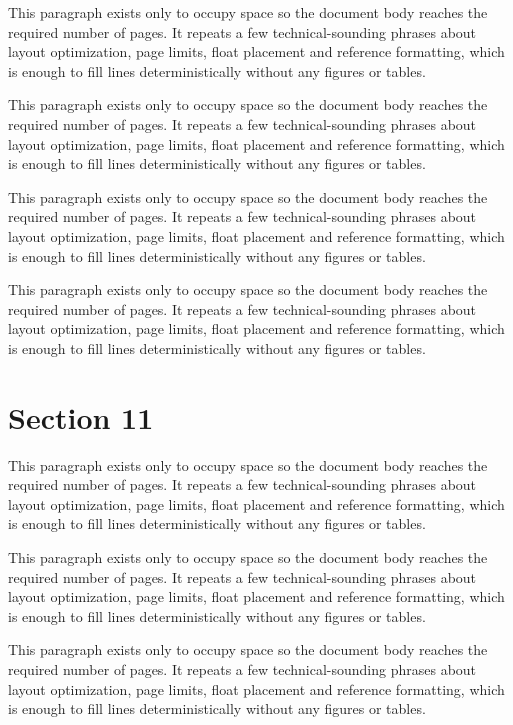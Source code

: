 \documentclass[10pt,letterpaper]{article}
\begin{document}
This paragraph exists only to occupy space so the document body reaches the required number of pages. It repeats a few technical-sounding phrases about layout optimization, page limits, float placement and reference formatting, which is enough to fill lines deterministically without any figures or tables.

This paragraph exists only to occupy space so the document body reaches the required number of pages. It repeats a few technical-sounding phrases about layout optimization, page limits, float placement and reference formatting, which is enough to fill lines deterministically without any figures or tables.

This paragraph exists only to occupy space so the document body reaches the required number of pages. It repeats a few technical-sounding phrases about layout optimization, page limits, float placement and reference formatting, which is enough to fill lines deterministically without any figures or tables.

This paragraph exists only to occupy space so the document body reaches the required number of pages. It repeats a few technical-sounding phrases about layout optimization, page limits, float placement and reference formatting, which is enough to fill lines deterministically without any figures or tables.

\section{Section 11}
This paragraph exists only to occupy space so the document body reaches the required number of pages. It repeats a few technical-sounding phrases about layout optimization, page limits, float placement and reference formatting, which is enough to fill lines deterministically without any figures or tables.

This paragraph exists only to occupy space so the document body reaches the required number of pages. It repeats a few technical-sounding phrases about layout optimization, page limits, float placement and reference formatting, which is enough to fill lines deterministically without any figures or tables.

This paragraph exists only to occupy space so the document body reaches the required number of pages. It repeats a few technical-sounding phrases about layout optimization, page limits, float placement and reference formatting, which is enough to fill lines deterministically without any figures or tables.
\end{document}
